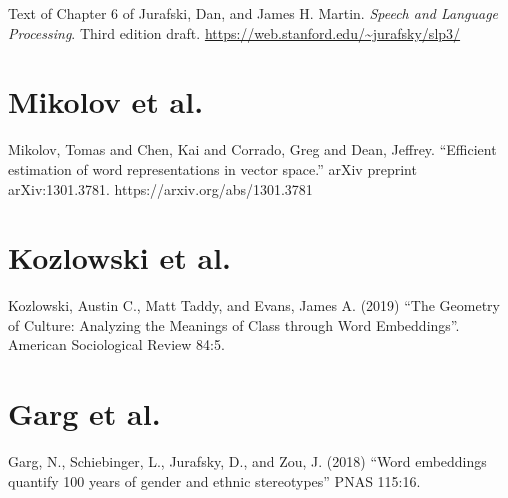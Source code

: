 \documentclass[a4paper]{report}
\begin{document}
Text of Chapter 6 of Jurafski, Dan, and James H. Martin. \emph{Speech and Language Processing}. Third edition draft. \url{https://web.stanford.edu/~jurafsky/slp3/}

  

\chapter{Mikolov et al.}

Mikolov, Tomas and Chen, Kai and Corrado, Greg and Dean, Jeffrey. ``Efficient estimation of word representations in vector space.'' arXiv preprint arXiv:1301.3781. https://arxiv.org/abs/1301.3781

  

\chapter{Kozlowski et al.}

Kozlowski, Austin C., Matt Taddy, and Evans, James A. (2019) ``The Geometry of Culture: Analyzing the Meanings of Class through Word Embeddings''. American Sociological Review 84:5.

  

\chapter{Garg et al.}

Garg, N., Schiebinger, L., Jurafsky, D., and Zou, J. (2018) ``Word embeddings quantify 100 years of gender and ethnic stereotypes'' PNAS 115:16.

  
\end{document}
